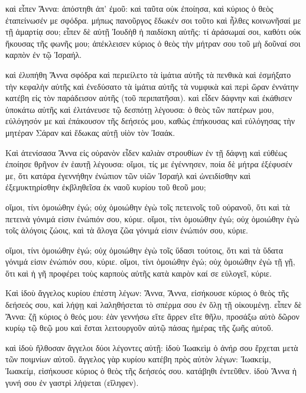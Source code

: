 \pend\pstart
καὶ εἶπεν Ἄννα: ἀπόστηθι ἀπ' ἐμοῦ: καὶ ταῦτα οὐκ ἐποίησα, καὶ κύριος ὁ θεὸς ἐταπείνωσέν με σφόδρα. μήπως πανοῦργος ἔδωκέν σοι τοῦτο καὶ ἦλθες κοινωνῆσαί με τῇ ἁμαρτίᾳ σου; εἶπεν δὲ αὐτῇ Ἰουδὴθ ἡ παιδίσκη αὐτῆς: τί ἀράσωμαί σοι, καθότι οὐκ ἤκουσας τῆς φωνῆς μου; ἀπέκλεισεν κύριος ὁ θεὸς τὴν μήτραν σου τοῦ μὴ δοῦναί σοι καρπὸν ἐν τῷ Ἰσραήλ.

\pend\pstart
καὶ ἐλυπήθη Ἄννα σφόδρα καὶ περιείλετο τὰ ἱμάτια αὐτῆς τὰ πενθικὰ καὶ ἐσμήξατο τὴν κεφαλὴν αὐτῆς καὶ ἐνεδύσατο τὰ ἱμάτια αὐτῆς τὰ νυμφικὰ καὶ περὶ ὥραν ἐννάτην κατέβη εἰς τὸν παράδεισον αὐτῆς (τοῦ περιπατῆσαι). καὶ εἶδεν δάφνην καὶ ἐκάθισεν ὑποκάτω αὐτῆς καὶ ἐλιτάνευσε τῷ δεσπότῃ λέγουσα: ὁ θεὸς τῶν πατέρων μου, εὐλόγησόν με καὶ ἐπάκουσον τῆς δεήσεός μου, καθὼς ἐπήκουσας καὶ εὐλόγησας τὴν μητέραν Σάραν καὶ ἔδωκας αὐτῇ υἱὸν τὸν Ἰσαάκ.

\pend\pstart
{}

\pend\setcounter{pstartL}{1}\pstart
Καὶ ἀτενίσασα Ἄννα εἰς οὐρανὸν εἶδεν καλιὰν στρουθίων ἐν τῇ δάφνῃ καὶ εὐθέως ἐποίησε θρῆνον ἐν ἑαυτῇ λέγουσα: οἴμοι, τίς με ἐγέννησεν, ποία δὲ μήτρα ἐξέφυσέν με, ὅτι κατάρα ἐγεννήθην ἐνώπιον τῶν υἱῶν Ἰσραήλ καὶ ὠνειδίσθην καὶ ἐξεμυκτηρίσθην ἐκβληθεῖσα ἐκ ναοῦ κυρίου τοῦ θεοῦ μου;

\pend\pstart
οἴμοι, τίνι ὁμοιώθην ἐγώ; οὐχ ὁμοιώθην ἐγὼ τοῖς πετεινοῖς τοῦ οὐρανοῦ, ὅτι καὶ τὰ πετεινὰ γόνιμά εἰσιν ἐνώπιόν σου, κύριε. οἴμοι, τίνι ὁμοιώθην ἐγώ; οὐχ ὁμοιώθην ἐγὼ τοῖς ἀλόγοις ζώοις, καὶ τὰ ἄλογα ζῶα γόνιμά εἰσιν ἐνώπιόν σου, κύριε.

\pend\pstart
οἴμοι, τίνι ὁμοιώθην ἐγώ; οὐχ ὁμοιώθην ἐγὼ τοῖς ὕδασι τούτοις, ὅτι καὶ τὰ ὕδατα γόνιμά εἰσιν ἐνώπιόν σου, κύριε. οἴμοι, τίνι ὁμοιώθην ἐγώ; οὐχ ὁμοιώθην ἐγὼ τῇ γῇ, ὅτι καὶ ἡ γῆ προφέρει τοὺς καρποὺς αὐτῆς κατὰ καιρὸν καί σε εὐλογεῖ, κύριε.

\pend\pstart
{}

\pend\setcounter{pstartL}{1}\pstart
Καὶ ἰδοὺ ἄγγελος κυρίου ἐπέστη λέγων: Ἄννα, Ἄννα, εἰσήκουσε κύριος ὁ θεὸς τῆς δεήσεός σου, καὶ λήψῃ καὶ λαληθήσεται τὸ σπέρμα σου ἐν ὅλῃ τῇ οἰκουμένῃ. εἶπεν δὲ Ἄννα: ζῇ κύριος ὁ θεός μου: ἐὰν γεννήσω εἴτε ἄρρεν εἴτε θῆλυ, προσάξω αὐτὸ δῶρον κυρίῳ τῷ θεῷ μου καὶ ἔσται λειτουργοῦν αὐτῷ πάσας ἡμέρας τῆς ζωῆς αὐτοῦ.

\pend\pstart
καὶ ἰδοὺ ἤλθοσαν ἄγγελοι δύοι λέγοντες αὐτῇ: ἰδοὺ Ἰωακεὶμ ὁ ἀνήρ σου ἔρχεται μετὰ τῶν ποιμνίων αὐτοῦ. ἄγγελος γὰρ κυρίου κατέβη πρὸς αὐτὸν λέγων: Ἰωακείμ, Ἰωακείμ, εἰσήκουσε κύριος ὁ θεὸς τῆς δεήσεός σου. κατάβηθι ἐντεῦθεν. ἰδοὺ Ἄννα ἡ γυνή σου ἐν γαστρὶ λήψεται (εἴληφεν).

